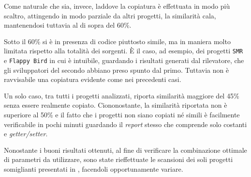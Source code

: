 Come naturale che sia, invece, laddove la copiatura è effettuata in modo più scaltro, attingendo in modo parziale da altri progetti, la similarità cala, mantenendosi tuttavia al di sopra del 60\%.

Sotto il 60\% si è in presenza di codice piuttosto simile, ma in maniera molto limitata rispetto alla totalità dei sorgenti.
%
\`E il caso, ad esempio, dei progetti \texttt{SMR} e \texttt{Flappy Bird} in cui è intuibile, guardando i risultati generati dal rilevatore, che gli sviluppatori del secondo abbiano preso spunto dal primo.
%
Tuttavia non è ravvisabile una copiatura evidente come nei precedenti casi.

Un solo caso, tra tutti i progetti analizzati, riporta similarità maggiore del 45\% senza essere realmente copiato.
%
Ciononostante, la similarità riportata non è superiore al 50\% e il fatto che i progetti non siano copiati né simili è facilmente verificabile in pochi minuti guardando il \textit{report} stesso che comprende solo costanti e \textit{getter/setter}.

Nonostante i buoni risultati ottenuti, al fine di verificare la combinazione ottimale di parametri da utilizzare, sono state rieffettuate le scansioni dei soli progetti somiglianti presentati in , facendoli opportunamente variare.

